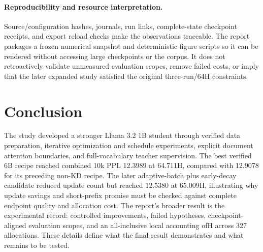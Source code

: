 \paragraph{Reproducibility and resource interpretation.}
Source/configuration hashes, journals, run links, complete-state checkpoint receipts, and export reload checks make the observations traceable. The report packages a frozen numerical snapshot and deterministic figure scripts so it can be rendered without accessing large checkpoints or the corpus. It does not retroactively validate unmeasured evaluation scopes, remove failed costs, or imply that the later expanded study satisfied the original three-run/64H constraints.

\section{Conclusion}
\label{sec:conclusion}

The study developed a stronger Llama 3.2 1B student through verified data preparation, iterative optimization and schedule experiments, explicit document attention boundaries, and full-vocabulary teacher supervision. The best verified 6B recipe reached combined 10k PPL 12.3989 at 64.711H, compared with 12.9078 for its preceding non-KD recipe. The later adaptive-batch plus early-decay candidate reduced update count but reached 12.5380 at 65.009H, illustrating why update savings and short-prefix promise must be checked against complete endpoint quality and allocation cost. The report's broader result is the experimental record: controlled improvements, failed hypotheses, checkpoint-aligned evaluation scopes, and an all-inclusive local accounting of\CombinedHours{}H across 327 allocations. These details define what the final result demonstrates and what remains to be tested.
